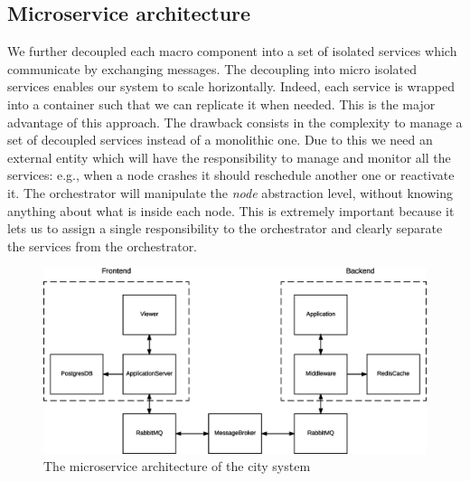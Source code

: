 \subsection{Microservice architecture}

We further decoupled each macro component into a set of isolated services
which communicate by exchanging messages. The decoupling into micro isolated
services enables our system to scale horizontally. Indeed, each service is wrapped
into a container such that we can replicate it when needed. This is the major advantage
of this approach. The drawback consists in the complexity to manage a set of decoupled
services instead of a monolithic one. Due to this we need an external entity which
will have the responsibility to manage and monitor all the services: e.g., when a node crashes it should reschedule another one or reactivate it. The orchestrator will
manipulate the \textit{node} abstraction level, without knowing anything about what is inside each node. This is extremely important because it lets us to assign
a single responsibility to the orchestrator and clearly separate the services from
the orchestrator.

\begin{figure}[H]
  \centering
  \includegraphics[scale=0.5,keepaspectratio]
    {images/solution/microservices.eps}
  \caption{The microservice architecture of the city system}
  \label{fig:sd-sys-arch-micro}
\end{figure}
